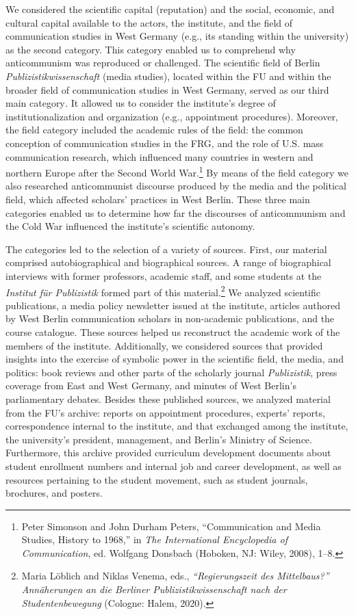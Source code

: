 \documentclass{tufte-handout}
\begin{document}
We considered the scientific capital (reputation) and the social,
economic, and cultural capital available to the actors, the institute,
and the field of communication studies in West Germany (e.g., its
standing within the university) as the second category. This category
enabled us to comprehend why anticommunism was reproduced or challenged.
The scientific field of Berlin \emph{Publizistikwissenschaft} (media
studies), located within the FU and within the broader field of
communication studies in West Germany, served as our third main
category\emph{.} It allowed us to consider the institute's degree of
institutionalization and organization (e.g., appointment procedures).
Moreover, the field category included the academic rules of the field:
the common conception of communication studies in the FRG, and the role
of U.S. mass communication research, which influenced many countries in
western and northern Europe after the Second World War.\footnote{Peter
  Simonson and John Durham Peters, ``Communication and Media Studies,
  History to 1968,'' in \emph{The International Encyclopedia of
  Communication}, ed. Wolfgang Donsbach (Hoboken, NJ: Wiley, 2008),
  1--8.} By means of the field category we also researched anticommunist
discourse produced by the media and the political field, which affected
scholars' practices in West Berlin. These three main categories enabled
us to determine how far the discourses of anticommunism and the Cold War
influenced the institute's scientific autonomy.

The categories led to the selection of a variety of sources. First, our
material comprised autobiographical and biographical sources. A range of
biographical interviews with former professors, academic staff, and some
students at the \emph{Institut für Publizistik} formed part of this
material.\footnote{Maria Löblich and Niklas Venema, eds.,
  \emph{``Regierungszeit des Mittelbaus?'' Annäherungen an die Berliner
  Publizistikwissenschaft nach der Studentenbewegung} (Cologne: Halem,
  2020).} We analyzed scientific publications, a media policy newsletter
issued at the institute, articles authored by West Berlin communication
scholars in non-academic publications, and the course catalogue. These
sources helped us reconstruct the academic work of the members of the
institute. Additionally, we considered sources that provided insights
into the exercise of symbolic power in the scientific field, the media,
and politics: book reviews and other parts of the scholarly journal
\emph{Publizistik}, press coverage from East and West Germany, and
minutes of West Berlin's parliamentary debates. Besides these published
sources, we analyzed material from the FU's archive: reports on
appointment procedures, experts' reports, correspondence internal to the
institute, and that exchanged among the institute, the university's
president, management, and Berlin's Ministry of Science. Furthermore,
this archive provided curriculum development documents about student
enrollment numbers and internal job and career development, as well as
resources pertaining to the student movement, such as student journals,
brochures, and posters.
\end{document}
